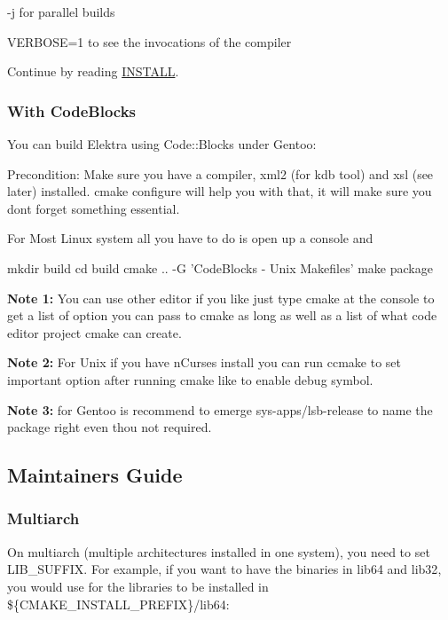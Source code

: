 \begin{DoxyItemize}
\item {\ttfamily -\/j} for parallel builds
\item {\ttfamily V\+E\+R\+B\+O\+SE=1} to see the invocations of the compiler
\end{DoxyItemize}

Continue by reading \hyperlink{doc_INSTALL_md}{I\+N\+S\+T\+A\+LL}.

\subsubsection*{With Code\+Blocks}

You can build Elektra using Code\+::\+Blocks under Gentoo\+:

Precondition\+: Make sure you have a compiler, xml2 (for kdb tool) and xsl (see later) installed. cmake configure will help you with that, it will make sure you don\textquotesingle{}t forget something essential.

For Most Linux system all you have to do is open up a console and


\begin{DoxyCode}
mkdir build
cd build
cmake .. -G 'CodeBlocks - Unix Makefiles'
make package
\end{DoxyCode}


{\bfseries Note 1\+:} You can use other editor if you like just type cmake at the console to get a list of option you can pass to cmake as long as well as a list of what code editor project cmake can create.

{\bfseries Note 2\+:} For Unix if you have n\+Curses install you can run {\ttfamily ccmake} to set important option after running cmake like to enable debug symbol.

{\bfseries Note 3\+:} for Gentoo is recommend to emerge sys-\/apps/lsb-\/release to name the package right even thou not required.

\subsection*{Maintainer\textquotesingle{}s Guide}

\subsubsection*{Multiarch}

On multiarch (multiple architectures installed in one system), you need to set {\ttfamily L\+I\+B\+\_\+\+S\+U\+F\+F\+IX}. For example, if you want to have the binaries in {\ttfamily lib64} and {\ttfamily lib32}, you would use for the libraries to be installed in {\ttfamily \$\{C\+M\+A\+K\+E\+\_\+\+I\+N\+S\+T\+A\+L\+L\+\_\+\+P\+R\+E\+F\+IX\}/lib64}\+:


